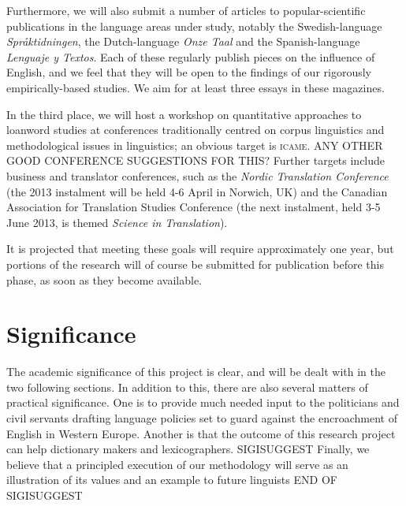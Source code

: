 \documentclass[a4paper]{article}
\begin{document}
Furthermore, we will also submit a number of articles to popular-scientific publications in the language areas under study, notably the Swedish-language \emph{Spr\aa ktidningen}, the Dutch-language \emph{Onze Taal} and the Spanish-language \\ \emph{Lenguaje y Textos}. Each of these regularly publish pieces on the influence of English, and we feel that they will be open to the findings of our rigorously empirically-based studies. We aim for at least three essays in these magazines.

In the third place, we will host a workshop on quantitative approaches to loanword studies at conferences traditionally centred on corpus linguistics and methodological issues in linguistics; an obvious target is \textsc{icame}. ANY OTHER GOOD CONFERENCE SUGGESTIONS FOR THIS? Further targets include business and translator conferences, such as the \emph{Nordic Translation Conference} (the 2013 instalment will be held 4-6 April in Norwich, UK) and the Canadian Association for Translation Studies Conference (the next instalment, held 3-5 June 2013, is themed \emph{Science in Translation}). 

It is projected that meeting these goals will require approximately one year, but portions of the research will of course be submitted for publication before this phase, as soon as they become available.



\section{Significance}
The academic significance of this project is clear, and will be dealt with in the two following sections. In addition to this, there are also several matters of  practical significance. One is to provide much needed input to the politicians and civil servants drafting language policies set to guard against the encroachment of English in Western Europe. Another is that the outcome of this research project can help dictionary makers and lexicographers. SIGISUGGEST Finally, we believe that a principled execution of our methodology will serve as an illustration of its values and an example to future linguists END OF SIGISUGGEST
\end{document}
